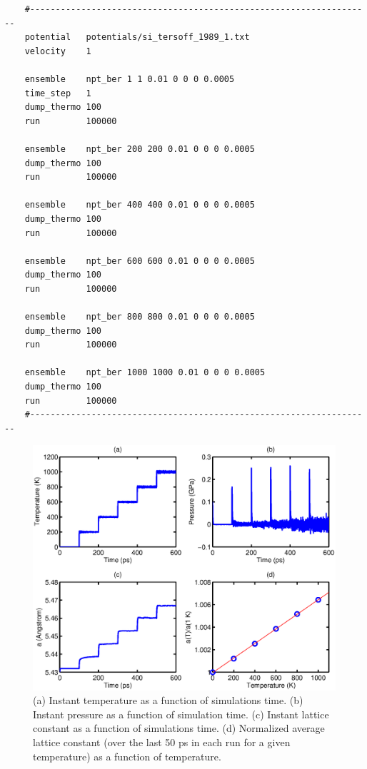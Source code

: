\documentclass[12pt,a4paper]{report}
\begin{document}
\begin{verbatim}
    #-------------------------------------------------------------------
    potential   potentials/si_tersoff_1989_1.txt
    velocity    1

    ensemble    npt_ber 1 1 0.01 0 0 0 0.0005
    time_step   1
    dump_thermo 100
    run         100000

    ensemble    npt_ber 200 200 0.01 0 0 0 0.0005
    dump_thermo 100
    run         100000

    ensemble    npt_ber 400 400 0.01 0 0 0 0.0005
    dump_thermo 100
    run         100000

    ensemble    npt_ber 600 600 0.01 0 0 0 0.0005
    dump_thermo 100
    run         100000

    ensemble    npt_ber 800 800 0.01 0 0 0 0.0005
    dump_thermo 100
    run         100000

    ensemble    npt_ber 1000 1000 0.01 0 0 0 0.0005
    dump_thermo 100
    run         100000
    #-------------------------------------------------------------------
\end{verbatim}


\begin{figure}[ht]
\begin{center}
\includegraphics[width=\columnwidth]{ex1.eps}
\caption{(a) Instant temperature as a function of simulations time. (b) Instant pressure as a function of simulation time. (c) Instant lattice constant as a function of simulations time. (d) Normalized average lattice constant (over the last 50 ps in each run for a given temperature) as a function of temperature.}
\label{figure:lattice_constant}
\end{center}
\end{figure}
\end{document}
